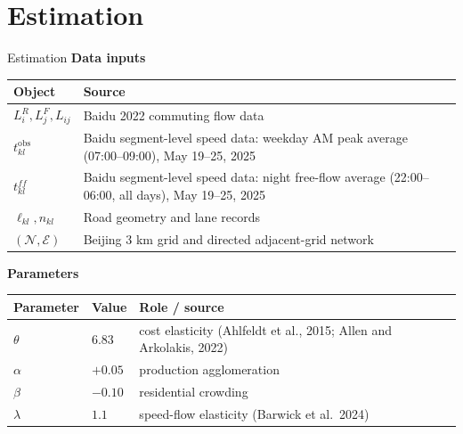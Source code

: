 \documentclass[11pt,aspectratio=169]{beamer}
\newcommand{\navfwd}[1]{\par\vspace{0.35em}\noindent\hfill\hyperlink{#1}{\beamergotobutton{details}}}
\begin{document}
\section{Estimation}\label{sec:quant}
\begin{frame}[label=estparams]{Estimation}
\small
\textbf{Data inputs}
\vspace{0.25em}

\scriptsize
\begin{tabularx}{0.92\textwidth}{@{}p{}X@{}}
\toprule
Object & Source \\
\midrule
$L_i^R,L_j^F,L_{ij}$ & Baidu 2022 commuting flow data \\
$t_{kl}^{\mathrm{obs}}$ & Baidu segment-level speed data: weekday AM peak average (07:00--09:00), May 19--25, 2025 \\
$t_{kl}^{ff}$ & Baidu segment-level speed data: night free-flow average (22:00--06:00, all days), May 19--25, 2025 \\
$\ell_{kl},n_{kl}$ & Road geometry and lane records \\
$(\mathcal N,\mathcal E)$ & Beijing 3 km grid and directed adjacent-grid network \\
\bottomrule
\end{tabularx}

\vspace{1.0em}
\textbf{Parameters}
\vspace{0.25em}

\scriptsize
\begin{tabularx}{0.92\textwidth}{@{}p{}p{}X@{}}
\toprule
Parameter & Value & Role / source \\
\midrule
$\theta$ & $6.83$ & cost elasticity (Ahlfeldt et al., 2015; Allen and Arkolakis, 2022) \\
$\alpha$ & $+0.05$ & production agglomeration \\
$\beta$ & $-0.10$ & residential crowding \\
$\lambda$ & $1.1$ & speed-flow elasticity (Barwick et al.\ 2024) \\
\bottomrule
\end{tabularx}
\navfwd{appparams}
\end{frame}
\end{document}
